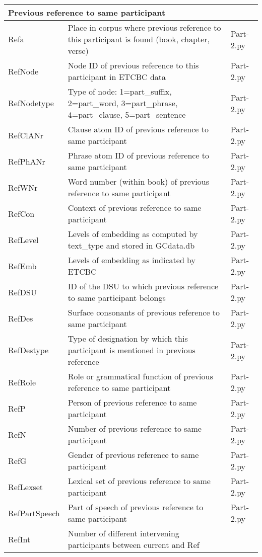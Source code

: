 \documentclass{article}
\begin{document}
\begin{longtable}{|l|p{}|l|}
\multicolumn{3}{|l|}{\bf{Previous reference to same participant}} \\ \hline
Refa & Place in corpus where previous reference to this participant is found (book, chapter, verse) & Part-2.py \\ \hline
RefNode & Node ID of previous reference to this participant in ETCBC data & Part-2.py \\ \hline
RefNodetype & Type of node: 1=part\_suffix, 2=part\_word, 3=part\_phrase, 4=part\_clause, 5=part\_sentence & Part-2.py \\ \hline
RefClANr & Clause atom ID of previous reference to same participant & Part-2.py \\ \hline
RefPhANr & Phrase atom ID of previous reference to same participant & Part-2.py \\ \hline
RefWNr & Word number (within book) of previous reference to same participant & Part-2.py \\ \hline
RefCon & Context of previous reference to same participant & Part-2.py \\ \hline
RefLevel & Levels of embedding as computed by text\_type and stored in GCdata.db & Part-2.py \\ \hline
RefEmb & Levels of embedding as indicated by ETCBC & Part-2.py \\ \hline
RefDSU & ID of the DSU to which previous reference to same participant belongs & Part-2.py \\ \hline
RefDes & Surface consonants of previous reference to same participant & Part-2.py \\ \hline
RefDestype & Type of designation by which this participant is mentioned in previous reference & Part-2.py \\ \hline
RefRole & Role or grammatical function of previous reference to same participant & Part-2.py \\ \hline
RefP & Person of previous reference to same participant & Part-2.py \\ \hline
RefN & Number of previous reference to same participant & Part-2.py \\ \hline
RefG & Gender of previous reference to same participant & Part-2.py \\ \hline
RefLexset & Lexical set of previous reference to same participant & Part-2.py \\ \hline
RefPartSpeech & Part of speech of previous reference to same participant & Part-2.py \\ \hline
RefInt & Number of different intervening participants between current and Ref & \\ \hline


\end{longtable}
\end{document}
